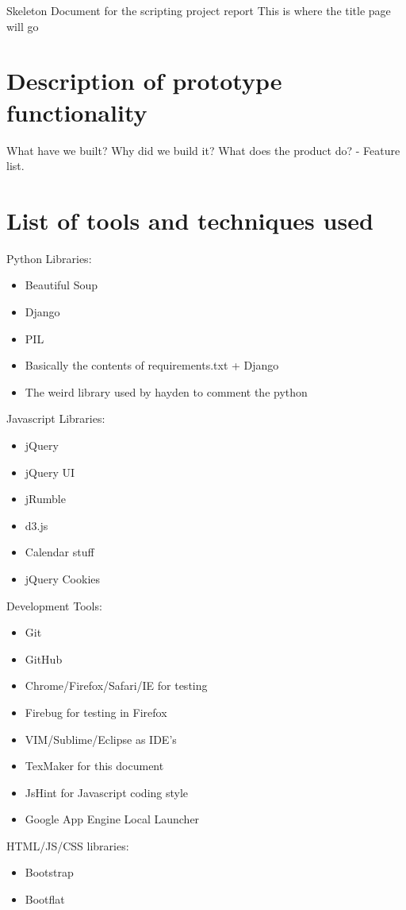 \documentclass[12pt, a4paper]{article}
\begin{document}
Skeleton Document for the scripting project report
This is where the title page will go

\newpage
\section{Description of prototype functionality}
What have we built?
Why did we build it?
What does the product do? - Feature list.

\newpage
\section{List of tools and techniques used}
Python Libraries:
\begin{itemize}
\item Beautiful Soup
\item Django
\item PIL
\item Basically the contents of requirements.txt + Django
\item The weird library used by hayden to comment the python
\end{itemize}

Javascript Libraries:
\begin{itemize}
\item jQuery
\item jQuery UI
\item jRumble
\item d3.js
\item Calendar stuff
\item jQuery Cookies
\end{itemize}

Development Tools:
\begin{itemize}
\item Git
\item GitHub
\item Chrome/Firefox/Safari/IE for testing
\item Firebug for testing in Firefox
\item VIM/Sublime/Eclipse as IDE's
\item TexMaker for this document
\item JsHint for Javascript coding style
\item Google App Engine Local Launcher
\end{itemize}

HTML/JS/CSS libraries:
\begin{itemize}
\item Bootstrap
\item Bootflat
\end{itemize}
\end{document}
